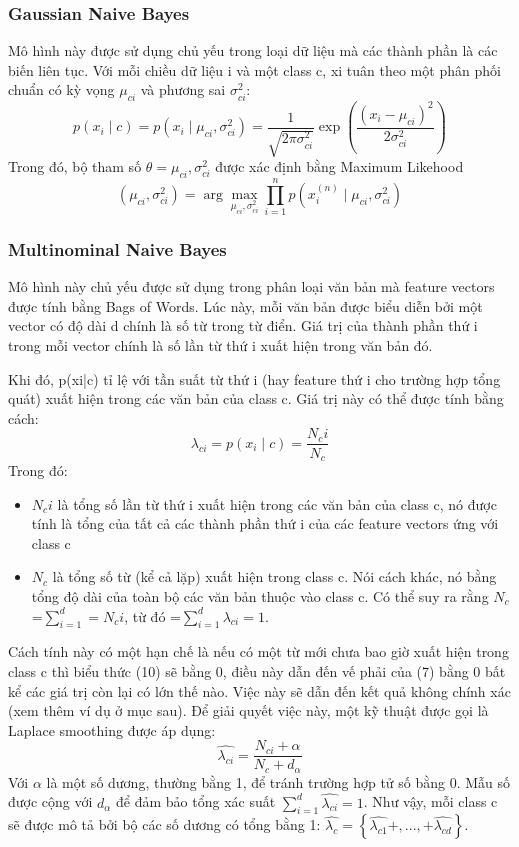 	\subsubsection{Gaussian Naive Bayes}
		Mô hình này được sử dụng chủ yếu trong loại dữ liệu mà các thành phần là các biến liên tục. Với mỗi chiều dữ liệu i và một class c, xi tuân theo một phân phối chuẩn có kỳ vọng $ \mu_{ci} $ và phương sai $\sigma_{ci}^2$:
	\begin{equation}
		p(x_i \mid c) = p(x_i \mid \mu_{ci}, \sigma_{ci}^2)=\frac{1}{\sqrt{2\pi\sigma_{ci}^2}}\exp(\frac{(x_i - \mu_{ci})^2}{2 \sigma_{ci}^2})  
	\end{equation}
		Trong đó, bộ tham số $\theta = { \mu_{ci}, \sigma_{ci}^2}$ được xác định bằng Maximum Likehood
	\begin{equation}
		(\mu_{ci}, \sigma_{ci}^2)=\arg\max_{\mu_{ci}, \sigma_{ci}^2}\prod_{i=1}^n p(x_i^(n) \mid \mu_{ci},\sigma_{ci}^2 )
	\end{equation}
	\subsubsection{Multinominal Naive Bayes}
	Mô hình này chủ yếu được sử dụng trong phân loại văn bản mà feature vectors được tính bằng Bags of Words. Lúc này, mỗi văn bản được biểu diễn bởi một vector có độ dài d chính là số từ trong từ điển. Giá trị của thành phần thứ i trong mỗi vector chính là số lần từ thứ i xuất hiện trong văn bản đó.
	
	Khi đó, p(xi|c) tỉ lệ với tần suất từ thứ i (hay feature thứ i cho trường hợp tổng quát) xuất hiện trong các văn bản của class c. Giá trị này có thể được tính bằng cách:
	\begin{equation}
		\lambda_{ci}=p(x_i \mid c) = \frac{N_ci}{N_c}
	\end{equation}
	Trong đó:
	\begin{itemize}
		\item $N_ci$ là tổng số lần từ thứ i xuất hiện trong các văn bản của class c, nó được tính là tổng của tất cả các thành phần thứ i của các feature vectors ứng với class c
		\item $N_c$ là tổng số từ (kể cả lặp) xuất hiện trong class c. Nói cách khác, nó bằng tổng độ dài của toàn bộ các văn bản thuộc vào class c. Có thể suy ra rằng $N_c$=$ \sum_{i=1}^d=N_ci$, từ đó =$ \sum_{i=1}^d \lambda_{ci}=1$.
	\end{itemize}
		
	Cách tính này có một hạn chế là nếu có một từ mới chưa bao giờ xuất hiện trong class c
	thì biểu thức (10) sẽ bằng 0, điều này dẫn đến vế phải của (7) bằng 0 bất kể các giá trị còn lại có lớn thế nào. Việc này sẽ dẫn đến kết quả không chính xác (xem thêm ví dụ ở mục sau).
	Để giải quyết việc này, một kỹ thuật được gọi là Laplace smoothing được áp dụng:
	\begin{equation}
		\hat{\lambda_{ci}} = \frac{N_{ci}+ \alpha}{N_c+d_\alpha}
	\end{equation}
	Với $\alpha$ là một số dương, thường bằng 1, để tránh trường hợp tử số bằng 0. Mẫu số được cộng với $d_\alpha$ để đảm bảo tổng xác suất $ \sum_{i=1}^d \hat{\lambda_{ci}}=1$.
	Như vậy, mỗi class c sẽ được mô tả bởi bộ các số dương có tổng bằng 1: $ \hat{\lambda_{c}}= \left\{\hat{\lambda_{c1}}+,...,+\hat{\lambda_{cd}}\right\}$.
